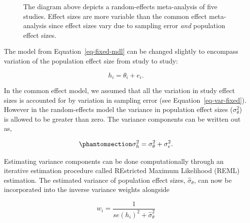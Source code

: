 \documentclass[
  letterpaper,
  DIV=11,
  numbers=noendperiod]{scrreprt}
\begin{document}
\begin{figure}[H]


\caption{\label{fig-random-effects}The diagram above depicts a
random-effects meta-analysis of five studies. Effect sizes are more
variable than the common effect meta-analysis since effect sizes vary
due to sampling error \emph{and} population effect sizes.}

\end{figure}%

The model from Equation~\ref{eq-fixed-mdl} can be changed slightly to
encompass variation of the population effect size from study to study:

\[
h_i = \theta_i + e_i.
\]

In the common effect model, we assumed that all the variation in study
effect sizes is accounted for by variation in sampling error (see
Equation~\ref{eq-var-fixed}). However in the random-effects model the
variance in population effect sizes (\(\sigma^2_\theta\)) is allowed to
be greater than zero. The variance components can be written out as,

\begin{equation}\phantomsection\label{eq-var-random}{
\sigma^2_h=\sigma^2_\theta + \sigma^2_e.
}\end{equation}

Estimating variance components can be done computationally through an
iterative estimation procedure called REstricted Maximum Likelihood
(REML) estimation. The estimated variance of population effect sizes,
\(\hat{\sigma}_\theta\), can now be incorporated into the inverse
variance weights alongside

\[
w_i = \frac{1}{se(h_i)^2 + \hat{\sigma}^2_\theta}
\]
\end{document}
